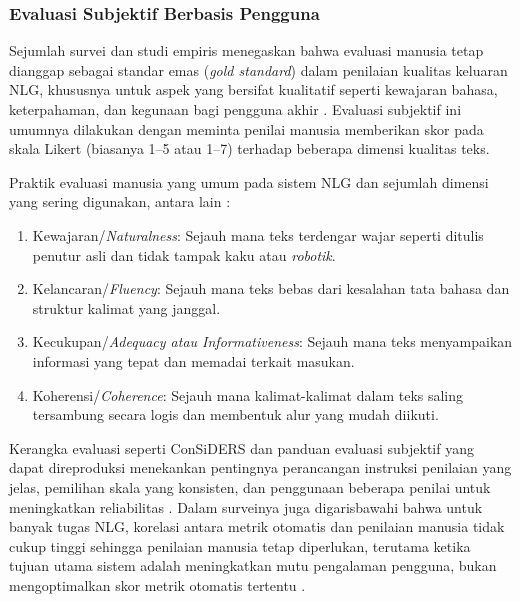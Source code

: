 \subsubsection{Evaluasi Subjektif Berbasis Pengguna}

Sejumlah survei dan studi empiris menegaskan bahwa evaluasi manusia tetap dianggap sebagai standar emas (\textit{gold standard}) dalam penilaian kualitas keluaran NLG, khususnya untuk aspek yang bersifat kualitatif seperti kewajaran bahasa, keterpahaman, dan kegunaan bagi pengguna akhir \autocite{vanDerLee2021HumanEval,Celikyilmaz2020EvalTextGen,Morrison2021ReproSubjective}. Evaluasi subjektif ini umumnya dilakukan dengan meminta penilai manusia memberikan skor pada skala Likert (biasanya 1--5 atau 1--7) terhadap beberapa dimensi kualitas teks.

Praktik evaluasi manusia yang umum pada sistem NLG dan sejumlah dimensi yang sering digunakan, antara lain \autocite{vanDerLee2021HumanEval}:
\begin{enumerate}[label=\alph*.]
    \item Kewajaran/\textit{Naturalness}: Sejauh mana teks terdengar wajar seperti ditulis penutur asli dan tidak tampak kaku atau \textit{robotik}.
    \item Kelancaran/\textit{Fluency}: Sejauh mana teks bebas dari kesalahan tata bahasa dan struktur kalimat yang janggal.
    \item Kecukupan/\textit{Adequacy atau \textit{Informativeness}}: Sejauh mana teks menyampaikan informasi yang tepat dan memadai terkait masukan.
    \item Koherensi/\textit{Coherence}: Sejauh mana kalimat-kalimat dalam teks saling tersambung secara logis dan membentuk alur yang mudah diikuti.
\end{enumerate}

Kerangka evaluasi seperti ConSiDERS dan panduan evaluasi subjektif yang dapat direproduksi menekankan pentingnya perancangan instruksi penilaian yang jelas, pemilihan skala yang konsisten, dan penggunaan beberapa penilai untuk meningkatkan reliabilitas \autocite{Elangovan2023ConSiDERS,Morrison2021ReproSubjective}. Dalam surveinya juga digarisbawahi bahwa untuk banyak tugas NLG, korelasi antara metrik otomatis dan penilaian manusia tidak cukup tinggi sehingga penilaian manusia tetap diperlukan, terutama ketika tujuan utama sistem adalah meningkatkan mutu pengalaman pengguna, bukan mengoptimalkan skor metrik otomatis tertentu \autocite{Sai2020NLGSurvey}.

